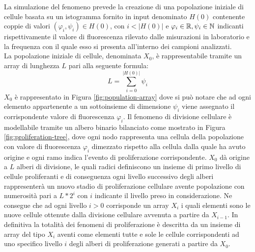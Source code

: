 La simulazione del fenomeno prevede la creazione di una popolazione iniziale
di cellule basata su un istogramma fornito in input denominato $H(0)$
contenente coppie di valori $(\varphi_{i}, \psi_{i}) \in H(0)$,
con $i < |H(0)|$ e $\varphi_{i} \in \mathbb{R}, \psi_{i} \in \mathbb{N}$
indicanti rispettivamente il
valore di fluorescenza rilevato dalle misurazioni in laboratorio e
la frequenza con il quale esso si presenta all'interno dei campioni analizzati.
\\
La popolazione iniziale di cellule, denominata $X_{0}$, è rappresentabile
tramite un array di
lunghezza $L$ pari alla seguente formula: 
$$L = \sum_{i=0}^{|H(0)|} \psi_{i}$$
$X_{0}$ è rappresentato in Figura \ref{fig:population-array} dove si
può notare che ad ogni elemento
appartenente a un sottoinsieme di dimensione $\psi_{i}$ viene assegnato il corrispondente
valore di fluorescenza $\varphi_{i}$.
Il fenomeno di divisione cellulare è modellabile tramite un albero binario 
bilanciato
come mostrato in Figura \ref{fig:proliferation-tree}, dove ogni nodo rappresenta
una cellula della popolazione con valore di fluorescenza $\varphi_{i}$
dimezzato rispetto alla cellula dalla quale ha avuto origine e ogni
ramo indica l'evento di proliferazione corrispondente.
$X_{0}$ dà origine a $L$ alberi di
divisione, le quali radici definiscono un insieme di primo livello di cellule
proliferanti e di conseguenza ogni livello successivo degli alberi rappresenterà
un nuovo stadio di proliferazione cellulare avente popolazione con numerosità
pari a $L * 2^{i}$ con $i$ indicante il livello preso in considerazione.
Ne consegue che ad ogni livello $i > 0$ corrisponde un array $X_{i}$ i quali
elementi sono le nuove cellule ottenute dalla divisione cellulare avvenuta a 
partire da $X_{i-1}$.
In definitiva la totalità dei fenomeni di proliferazione è descritta da un
insieme di array del tipo $X_{i}$ aventi come elementi tutte e sole le cellule
corrispondenti ad uno specifico livello $i$ degli alberi di proliferazione
generati a partire da $X_{0}$.
